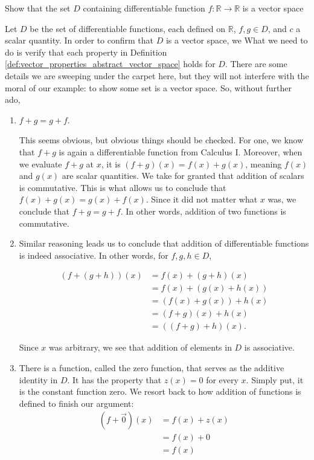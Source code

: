 {Show that the set $D$ containing differentiable function $f:\mathbb{R}\to\mathbb{R}$ is a vector space}
{
Let $D$ be the set of differentiable functions, each defined on $\mathbb{R}$,  $f,g\in D$, and $c$ a scalar quantity.  In order to confirm that $D$ is a vector space, we What we need to do is verify that each property in Definition \ref{def:vector_properties_abstract_vector_space} holds for $D$.  There are some details we are sweeping under the carpet here, but they will not interfere with the moral of our example: to show some set is a vector space.  So, without further ado,

\begin{enumerate}
	\item $f+g = g+f$.  
	
	This seems obvious, but obvious things should be checked.  For one, we know that $f+g$ is again a differentiable function from Calculus I.  Moreover, when we evaluate $f+g$ at $x$, it is $(f+g)(x) = f(x)+g(x)$, meaning $f(x)$ and $g(x)$ are scalar quantities.  We take for granted that addition of scalars is commutative. This is what allows us to conclude that $f(x) +g(x) = g(x) + f(x)$. Since it did not matter what $x$ was, we conclude that $f+g = g+f$.  In other words, addition of two functions is commutative. 
	
	\item Similar reasoning leads us to conclude that addition of differentiable functions is indeed associative.  In other words, for $f,g,h\in D$, 
	
	\begin{align*}
		(f+(g+h))(x) &= f(x)+(g+h)(x)\\
							&=f(x)+(g(x)+h(x))\\
							&=(f(x)+g(x))+h(x)\\
							&=(f+g)(x)+h(x)\\
							&=((f+g)+h)(x).
	\end{align*}	
	
	Since $x$ was arbitrary, we see that addition of elements in $D$ is associative.
	
	
	\item There is a function, called the zero function, that serves as the additive identity in $D$.  It has the property that $z(x) =0 $ for every $x$.  Simply put, it is the constant function zero.  We resort back to how addition of functions is defined to finish our argument: 
	 \begin{align*} 
	 (f+\vec{0})(x) &= f(x)+z(x)\\
	 					   &= f(x)+0\\
	 					   &= f(x)
	 \end{align*}
	 

\end{enumerate}}
